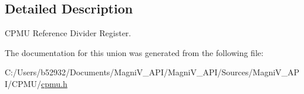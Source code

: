 \subsection{Detailed Description}
C\+P\+M\+U Reference Divider Register. 

The documentation for this union was generated from the following file\+:\begin{DoxyCompactItemize}
\item 
C\+:/\+Users/b52932/\+Documents/\+Magni\+V\+\_\+\+A\+P\+I/\+Magni\+V\+\_\+\+A\+P\+I/\+Sources/\+Magni\+V\+\_\+\+A\+P\+I/\+C\+P\+M\+U/\hyperlink{cpmu_8h}{cpmu.\+h}\end{DoxyCompactItemize}
